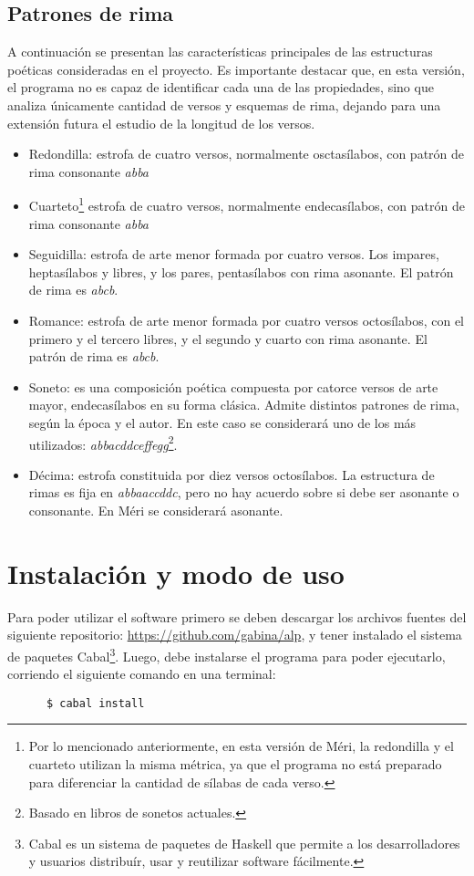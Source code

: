 \documentclass[12pt, a4paper]{article}
\begin{document}
\subsection*{Patrones de rima}
A continuación se presentan las características principales de las estructuras poéticas consideradas en el proyecto. Es importante destacar que, en esta versión, el programa no es capaz de identificar cada una de las propiedades, sino que analiza únicamente cantidad de versos y esquemas de rima, dejando para una extensión futura el estudio de la longitud de los versos.
\begin{itemize}
	\item Redondilla: estrofa de cuatro versos, normalmente osctasílabos, con patrón de rima consonante \textit{abba}
	\item Cuarteto\footnote{Por lo mencionado anteriormente, en esta versión de Méri, la redondilla y el cuarteto utilizan la misma métrica, ya que el programa no está preparado para diferenciar la cantidad de sílabas de cada verso.} estrofa de cuatro versos, normalmente endecasílabos, con patrón de rima consonante \textit{abba}
	\item Seguidilla: estrofa de arte menor formada por cuatro versos. Los impares, heptasílabos y libres, y los pares, pentasílabos con rima asonante. El patrón de rima es \textit{abcb}.
	\item Romance: estrofa de arte menor formada por cuatro versos octosílabos, con el primero y el tercero libres, y el segundo y cuarto con rima asonante. El patrón de rima es \textit{abcb}.
	\item Soneto: es una composición poética compuesta por catorce versos de arte mayor, endecasílabos en su forma clásica. Admite distintos patrones de rima, según la época y el autor. En este caso se considerará uno de los más utilizados: \textit{abbacddceffegg}\footnote{Basado en libros de sonetos actuales.}.
	\item Décima:  estrofa constituida por diez versos octosílabos. La estructura de rimas es fija en \textit{abbaaccddc}, pero no hay acuerdo sobre si debe ser asonante o consonante. En Méri se considerará asonante.

\end{itemize}

\section*{Instalación y modo de uso}
\label{uso}
Para poder utilizar el software primero se deben descargar los archivos fuentes del siguiente repositorio: \url{https://github.com/gabina/alp}, y tener instalado el sistema de paquetes Cabal\footnote{Cabal es un sistema de paquetes de Haskell que permite a los desarrolladores y usuarios distribuír, usar y reutilizar software fácilmente.}. Luego, debe instalarse el programa para poder ejecutarlo, corriendo el siguiente comando en una terminal:
\begin{verbatim}
      $ cabal install
\end{verbatim}
\end{document}
